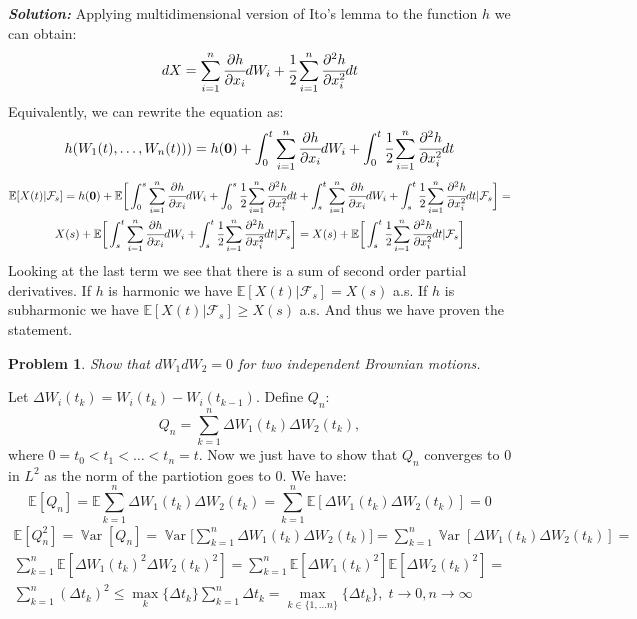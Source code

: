 \documentclass[a4paper, 12pt]{article}
\theoremstyle{problemstyle}
\newtheorem{problem}{Problem}[section]
\newenvironment{solution}
{\textit{\textbf{Solution:}}}
{}
\newcommand{\E}{\mathbb{E}}
\DeclareMathOperator{\Var}{\mathbb{V}ar}
\begin{document}
\begin{solution}
	Applying multidimensional version of Ito's lemma to the function $h$ we can obtain:
	$$
	dX = \sum_{i=1}^n \cfrac{\partial h}{\partial x_i} dW_i + \cfrac{1}{2} \sum_{i=1}^n \cfrac{\partial^2 h}{\partial x_i^2} dt
	$$
	Equivalently, we can rewrite the equation as:
	$$
	h(W_1(t), \ldots, W_n(t)) ) = h(\boldsymbol{0}) + \int_0^t  \sum_{i=1}^n \cfrac{\partial h}{\partial x_i} dW_i + \int_0^t\cfrac{1}{2} \sum_{i=1}^n \cfrac{\partial^2 h}{\partial x_i^2} dt
	$$
	\begin{multline*}
		\E[X(t)| \mathcal{F}_s] = h(\boldsymbol{0})  + \E\bigg[ \int_0^s  \sum_{i=1}^n \cfrac{\partial h}{\partial x_i} dW_i + \int_0^s\cfrac{1}{2} \sum_{i=1}^n \cfrac{\partial^2 h}{\partial x_i^2} dt + \int_s^t  \sum_{i=1}^n \cfrac{\partial h}{\partial x_i} dW_i + \int_s^t\cfrac{1}{2} \sum_{i=1}^n \cfrac{\partial^2 h}{\partial x_i^2} dt | \mathcal{F}_s \bigg ] =  \\
		X(s) + \E \bigg[ \int_s^t  \sum_{i=1}^n \cfrac{\partial h}{\partial x_i} dW_i + \int_s^t\cfrac{1}{2} \sum_{i=1}^n \cfrac{\partial^2 h}{\partial x_i^2} dt | \mathcal{F}_s \bigg ] = X(s) + \E \bigg[ \int_s^t\cfrac{1}{2} \sum_{i=1}^n \cfrac{\partial^2 h}{\partial x_i^2} dt | \mathcal{F}_s \bigg ]
	\end{multline*}
	Looking at the last term we see that there is a sum of second order partial derivatives. If $h$ is harmonic we have $\E[X(t)|\mathcal{F}_s] = X(s)$ a.s. If  $h$ is subharmonic we have $\E[X(t)|\mathcal{F}_s] \geq X(s)$ a.s. And thus we have proven the statement.

\end{solution}

\begin{problem}
	Show that $dW_1 dW_2 = 0 $ for two independent Brownian motions.
\end{problem}
Let $\Delta W_i(t_k)  = W_i(t_k) - W_i(t_{k-1})$.
Define $Q_n$:
$$
Q_n = \sum_{k=1}^n  \Delta W_1(t_k) \Delta W_2(t_k),
$$
where $0 = t_0 < t_1 < \ldots <t_n = t$. Now we just have to show that $Q_n$ converges to $0$ in $L^2$ as the norm of the partiotion goes to $0$. We have:
$$
\E[Q_n] = \E \sum_{k=1}^n  \Delta W_1(t_k) \Delta W_2(t_k)  =  \sum_{k=1}^n  \E[ \Delta W_1(t_k) \Delta W_2(t_k)] = 0
$$
\begin{multline*}
\E[Q_n^2] = \Var[Q_n]  = \Var\bigg[ \sum_{k=1}^n  \Delta W_1(t_k) \Delta W_2(t_k)  \bigg] = 
 \sum_{k=1}^n \Var[\Delta W_1(t_k) \Delta W_2(t_k)] = \\
 \sum_{k=1}^n  \E[\Delta W_1(t_k)^2 \Delta W_2(t_k)^2] = \sum_{k=1}^n  \E[\Delta W_1(t_k)^2] \E[\Delta W_2(t_k)^2]  = \\ \sum_{k=1}^n  (\Delta t_k)^2 \leq 
 \max_k \{\Delta t_k \} \sum_{k=1}^n \Delta t_k =  \max_{k \in \{1, \ldots n\}} \{\Delta t_k \}, \; t \to 0, n \to \infty
\end{multline*}
\end{document}
